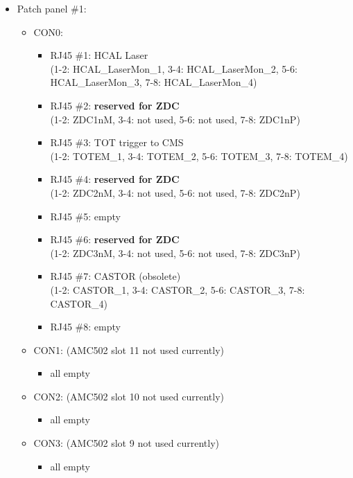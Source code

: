 \begin{itemize}
\begin{itemize}
\end{itemize}
\item \small Patch panel \#1:
\begin{itemize}
\item \small CON0:
\begin{itemize}
    \item \small RJ45 \#1: HCAL Laser \\\tiny{(1-2: HCAL\_LaserMon\_1, 3-4: HCAL\_LaserMon\_2, 5-6: HCAL\_LaserMon\_3, 7-8: HCAL\_LaserMon\_4)}\normalsize
    \item \small RJ45 \#2: \textbf{reserved for ZDC} \\\tiny{(1-2: ZDC1nM, 3-4: not used, 5-6: not used, 7-8: ZDC1nP)}\normalsize
    \item \small RJ45 \#3: TOT trigger to CMS \\\tiny{(1-2: TOTEM\_1, 3-4: TOTEM\_2, 5-6: TOTEM\_3, 7-8: TOTEM\_4)}\normalsize
    \item \small RJ45 \#4: \textbf{reserved for ZDC} \\\tiny{(1-2: ZDC2nM, 3-4: not used, 5-6: not used, 7-8: ZDC2nP)}\normalsize
    \item \small RJ45 \#5: empty
    \item \small RJ45 \#6: \textbf{reserved for ZDC} \\\tiny{(1-2: ZDC3nM, 3-4: not used, 5-6: not used, 7-8: ZDC3nP)}\normalsize
    \item \small RJ45 \#7: CASTOR (obsolete) \\\tiny{(1-2: CASTOR\_1, 3-4: CASTOR\_2, 5-6: CASTOR\_3, 7-8: CASTOR\_4)}\normalsize
    \item \small RJ45 \#8: empty
\end{itemize}
\item \small CON1: (AMC502 slot 11 not used currently)
\begin{itemize}
    \item all empty
\end{itemize}
\item \small CON2: (AMC502 slot 10 not used currently)
\begin{itemize}
    \item all empty
\end{itemize}
\item \small CON3: (AMC502 slot 9 not used currently)
\begin{itemize}
    \item all empty
\end{itemize}
\end{itemize}
\end{itemize}

\clearpage

